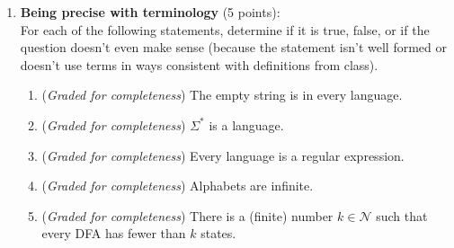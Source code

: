 \documentclass[12pt, oneside]{article}
\newcommand{\gradeCorrect}{({\it Graded for correctness}) }
\newcommand{\gradeComplete}{({\it Graded for completeness}) }
\begin{document}
\begin{enumerate}[wide, labelwidth=!, labelindent=0pt]
    \begin{enumerate}
    \item \gradeComplete Find and fix the mistake in the 
    following symbolic description of the transition function $\delta \colon Q \times \Sigma \to Q$: for each $j \in \{0,1\}$
    \[
    \delta(q_0, j) = q_j \hspace{2cm} \delta(q_1, j) = q_{1-j} \hspace{2cm} \delta(q_2, j) = q_{1+j}
    \]
    \item \gradeCorrect Keeping the same set of states $Q = \{q_0, q_1, q_2\}$, alphabet $\Sigma = \{0,1\}$, starting state $q_0$, and set
    of accepting states $F = \{q_0\}$, change the transition function $\delta$ so that the resulting finite
    automaton recognizes the language 
    described by the regular expression
    \[
        0^* \cup \Sigma^* 1000^*
    \]
    Briefly justify why the resulting finite automaton works 
    by describing the role of each state with your new transition function and relating it to a plain English description 
    of the language described by the regular expression.

    Note: with regular expressions $*$ binds more tightly than concatenation 
    so $1000^* = (100)(0^*)$.

    \end{enumerate}
    {\it (Challenge question, not graded) There is a beautiful plain English description of the language recognized by the finite automaton
    with the state diagram depicted at the start of Problem~3. 
    What is it?}

\item \textbf{Being precise with terminology} (5 points): \\
    For each of the following statements, determine if 
    it is true, false, or if the question doesn't even 
    make sense (because the statement isn't well formed
    or doesn't use terms in ways consistent with definitions from class).

    \begin{enumerate}
    \item\gradeComplete The empty string is in every language.
    \item\gradeComplete $\Sigma^*$ is a language.
    \item\gradeComplete Every language is a regular expression.
    \item\gradeComplete Alphabets are infinite.
    \item\gradeComplete There is a (finite) number $k \in \mathcal N$ such that every DFA has fewer than $k$ states.
    \end{enumerate}
\end{enumerate}
\newpage
\end{document}
